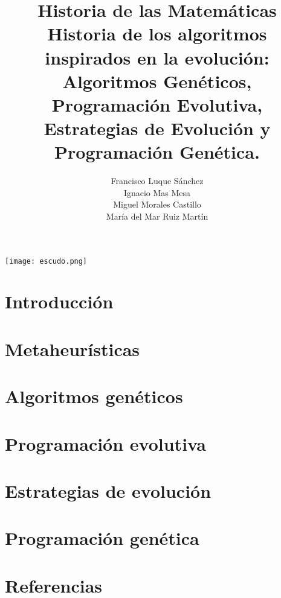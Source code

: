 \documentclass[12pt]{article} \usepackage[utf8x]{inputenc}
\title{
  Historia de las Matemáticas\\
  \large Historia de los algoritmos inspirados en la evolución:
  Algoritmos Genéticos, Programación Evolutiva, Estrategias de
  Evolución y Programación Genética.  }
\author{ 
  Francisco Luque Sánchez \\
  Ignacio Mas Mesa \\
  Miguel Morales Castillo \\
  María del Mar Ruiz Martín \\
}
\begin{document}
\maketitle
\begin{center}  
\texttt{[image: escudo.png]}
\end{center}

\newpage

\tableofcontents %


\pagebreak

\section{Introducción}

\section{Metaheurísticas}

\section{Algoritmos genéticos}

\section{Programación evolutiva}

\section{Estrategias de evolución}

\section{Programación genética}

\section{Referencias}
\end{document}
